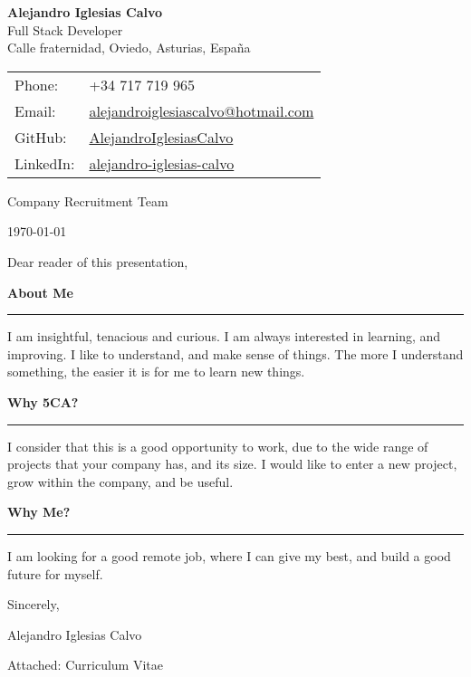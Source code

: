 \documentclass[11pt, a4paper]{article}
\newenvironment{cvletter}{\begin{flushleft}}{\end{flushleft}}
\newcommand{\lettersection}[1]{%
  \vspace{8pt}%
  \color{awesome}\large\bfseries #1%
  \color{black}\\[1pt]\hrule\vspace{4pt}%
}
\begin{document}
\begin{minipage}[t]{1.0\textwidth}
  \begin{center}
    {\LARGE\bfseries Alejandro Iglesias Calvo}\\[5pt]
    {\large\textcolor{awesome}{Full Stack Developer}}\\[5pt]
    {\small Calle fraternidad, Oviedo, Asturias, España}
    \vspace{10pt}
    
    \begin{tabular}{@{}ll@{}}
      Phone: & +34 717 719 965 \\
      Email: & \href{mailto:alejandroiglesiascalvo@hotmail.com}{alejandroiglesiascalvo@hotmail.com} \\
      GitHub: & \href{https://github.com/AlejandroIglesiasCalvo}{AlejandroIglesiasCalvo} \\
      LinkedIn: & \href{https://linkedin.com/in/alejandro-iglesias-calvo}{alejandro-iglesias-calvo}
    \end{tabular}
  \end{center}
\end{minipage}

\vspace{20pt}

Company Recruitment Team

\vspace{10pt}

\today

\vspace{20pt}

Dear reader of this presentation,

\vspace{10pt}

\begin{cvletter}
  \lettersection{About Me}
  I am insightful, tenacious and curious. I am always interested in learning, and improving. I like to understand, and make sense of things. The more I understand something, the easier it is for me to learn new things.

  \lettersection{Why 5CA?}
  I consider that this is a good opportunity to work, due to the wide range of projects that your company has, and its size. I would like to enter a new project, grow within the company, and be useful.

  \lettersection{Why Me?}
  I am looking for a good remote job, where I can give my best, and build a good future for myself.
\end{cvletter}

\vspace{10pt}
Sincerely,

\vspace{20pt}

Alejandro Iglesias Calvo

\vspace{10pt}

\small Attached: Curriculum Vitae
\end{document}
